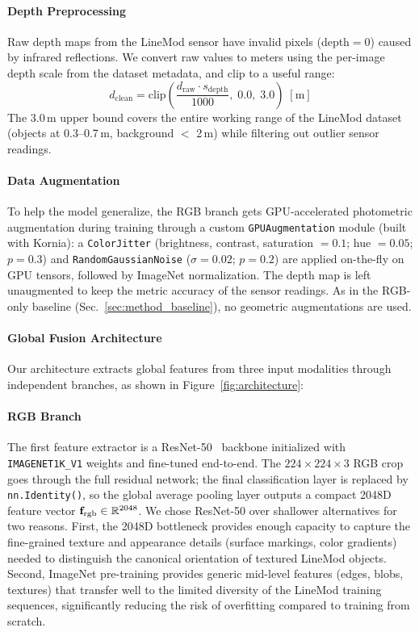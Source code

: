 \paragraph{Depth Preprocessing}
Raw depth maps from the LineMod sensor have invalid pixels (depth$=$0) caused by infrared reflections. We convert raw values to meters using the per-image depth scale from the dataset metadata, and clip to a useful range:
\begin{equation}
    d_{\text{clean}} = \text{clip}\left(\frac{d_{\text{raw}} \cdot s_{\text{depth}}}{1000}, \; 0.0, \; 3.0\right) \; [\text{m}]
    \label{eq:depth_clip}
\end{equation}
The 3.0\,m upper bound covers the entire working range of the LineMod dataset (objects at 0.3--0.7\,m, background $<$ 2\,m) while filtering out outlier sensor readings.

\paragraph{Data Augmentation}
To help the model generalize, the RGB branch gets GPU-accelerated photometric augmentation during training through a custom \texttt{GPUAugmentation} module (built with Kornia): a \texttt{ColorJitter} (brightness, contrast, saturation $=0.1$; hue $=0.05$; $p=0.3$) and \texttt{RandomGaussianNoise} ($\sigma=0.02$; $p=0.2$) are applied on-the-fly on GPU tensors, followed by ImageNet normalization. The depth map is left unaugmented to keep the metric accuracy of the sensor readings. As in the RGB-only baseline (Sec.~\ref{sec:method_baseline}), no geometric augmentations are used.

\paragraph{Global Fusion Architecture}
Our architecture extracts global features from three input modalities through independent branches, as shown in Figure~\ref{fig:architecture}:

\paragraph{RGB Branch}
The first feature extractor is a ResNet-50~\cite{he2016deep} backbone initialized with \texttt{IMAGENET1K\_V1} weights and fine-tuned end-to-end.
The $224\!\times\!224\!\times\!3$ RGB crop goes through the full residual network; the final classification layer is replaced by \texttt{nn.Identity()}, so the global average pooling layer outputs a compact 2048D feature vector $\mathbf{f}_{\text{rgb}} \in \mathbb{R}^{2048}$.
We chose ResNet-50 over shallower alternatives for two reasons.
First, the 2048D bottleneck provides enough capacity to capture the fine-grained texture and appearance details (surface markings, color gradients) needed to distinguish the canonical orientation of textured LineMod objects.
Second, ImageNet pre-training provides generic mid-level features (edges, blobs, textures) that transfer well to the limited diversity of the LineMod training sequences, significantly reducing the risk of overfitting compared to training from scratch.

